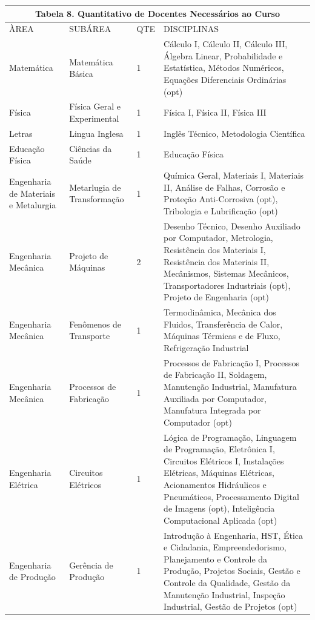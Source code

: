 \documentclass{paper}
\begin{document}
\else
    \begin{longtable}{|p{3.0cm}|p{3.0cm}|p{1.0cm}|p{6.8cm}|}
    \multicolumn{4}{c}{\textbf{Tabela 8. Quantitativo de Docentes Necessários ao Curso}}
    \label{tab1} \\ \hline 
    \cellcolor{\cinza}ÀREA & \cellcolor{\cinza}SUBÁREA & \cellcolor{\cinza}QTE & \cellcolor{\cinza}DISCIPLINAS \\ 
    \hline
    Matemática   &  Matemática Básica  &  1  &  Cálculo I, Cálculo II, Cálculo III, Álgebra Linear, Probabilidade e Estatística, Métodos Numéricos, Equações Diferenciais Ordinárias (opt) \\ \hline
    Física   &  Física Geral e Experimental  &  1  &  Física I, Física II, Física III \\ \hline
    Letras   &  Lingua Inglesa  &  1  &  Inglês Técnico, Metodologia Científica \\ \hline
    Educação Física &  Ciências da Saúde  &  1  &  Educação Física \\ \hline
    Engenharia de Materiais e Metalurgia  &  Metarlugia de Transformação  &  1  &  Química Geral, Materiais I, Materiais II, Análise de Falhas, Corrosão e Proteção Anti-Corrosiva (opt), Tribologia e Lubrificação (opt) \\ \hline
    Engenharia Mecânica   &  Projeto de Máquinas  &  2  &  Desenho Técnico, Desenho Auxiliado por Computador, Metrologia, Resistência dos Materiais I, Resistência dos Materiais II, Mecânismos, Sistemas Mecânicos, Transportadores Industriais (opt), Projeto de Engenharia (opt) \\ \hline
    Engenharia Mecânica   &  Fenômenos de Transporte  &  1  &  Termodinâmica, Mecânica dos Fluidos, Transferência de Calor, Máquinas Térmicas e de Fluxo, Refrigeração Industrial \\ \hline
    Engenharia Mecânica   &  Processos de Fabricação  &  1  &  Processos de Fabricação I, Processos de Fabricação II, Soldagem, Manutenção Industrial, Manufatura Auxiliada por Computador, Manufatura Integrada por Computador (opt) \\ \hline
    Engenharia Elétrica   &  Circuitos Elétricos  &  1  &  Lógica de Programação, Linguagem de Programação, Eletrônica I, Circuitos Elétricos I, Instalações Elétricas, Máquinas Elétricas, Acionamentos Hidráulicos e Pneumáticos, Processamento Digital de Imagens (opt), Inteligência Computacional Aplicada (opt) \\ \hline
    Engenharia de Produção   &  Gerência de Produção  &  1  &  Introdução à Engenharia, HST, Ética e Cidadania, Empreendedorismo, Planejamento e Controle da Produção, Projetos Sociais, Gestão e Controle da Qualidade, Gestão da Manutenção Industrial, Inspeção Industrial, Gestão de Projetos (opt) \\ \hline
   \end{longtable}
\fi
\end{document}
